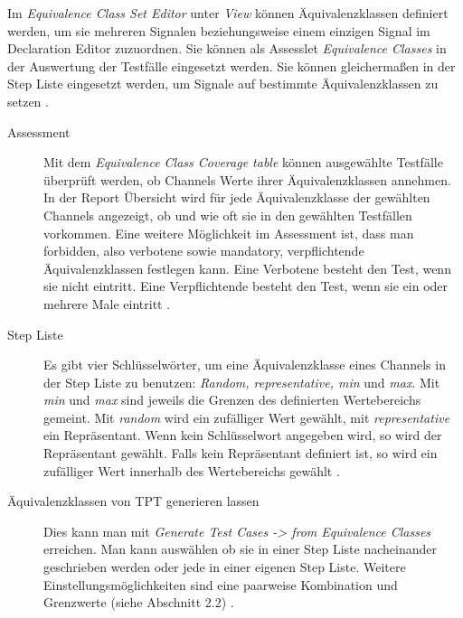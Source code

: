 Im \textit{Equivalence Class Set Editor} unter \textit{View} können Äquivalenzklassen definiert werden, um sie 
mehreren Signalen beziehungsweise einem einzigen Signal im Declaration Editor zuzuordnen.
Sie können als Assesslet \textit{Equivalence Classes} in der Auswertung der Testfälle eingesetzt werden.
Sie können gleichermaßen in der Step Liste eingesetzt werden, um
Signale auf bestimmte Äquivalenzklassen zu setzen \cite[vgl.][S. 370 ff.]{userguide}.\\
\begin{description}
\item[Assessment]%
Mit dem \textit{Equivalence Class Coverage table} können
ausgewählte Testfälle überprüft werden, ob Channels Werte ihrer Äquivalenzklassen
annehmen. In der Report Übersicht wird für jede Äquivalenzklasse der 
gewählten Channels angezeigt, ob und wie oft sie in den gewählten Testfällen vorkommen.
Eine weitere Möglichkeit im Assessment ist, dass 
man forbidden, also verbotene sowie mandatory, verpflichtende
Äquivalenzklassen festlegen kann. Eine Verbotene
besteht den Test, wenn sie nicht eintritt.
Eine Verpflichtende besteht den Test, wenn sie ein
oder mehrere Male eintritt \cite[vgl.][S. 1282 ff.]{userguide}.\\
\item[Step Liste]%
Es gibt vier Schlüsselwörter, um eine Äquivalenzklasse eines Channels
in der Step Liste zu benutzen: \textit{Random, representative, min} und \textit{max}.
Mit \textit{min} und \textit{max} sind jeweils die Grenzen des definierten Wertebereichs gemeint. Mit \textit{random} wird ein zufälliger Wert gewählt, mit \textit{representative} ein Repräsentant.
Wenn kein Schlüsselwort angegeben wird, so wird der Repräsentant gewählt.
Falls kein Repräsentant definiert ist, so wird ein zufälliger Wert innerhalb des Wertebereichs
gewählt \cite[vgl.][S. 379 f.]{userguide}.\\
\item[Äquivalenzklassen von TPT generieren lassen]
Dies kann man mit \textit{Generate Test Cases -> from Equivalence Classes} erreichen.
Man kann auswählen ob sie in einer Step Liste nacheinander
geschrieben werden oder jede in einer 
eigenen Step Liste. Weitere Einstellungsmöglichkeiten sind eine paarweise Kombination und Grenzwerte (siehe Abschnitt 2.2) \cite[vgl.][S. 668 ff.]{userguide}. 
\end{description}
